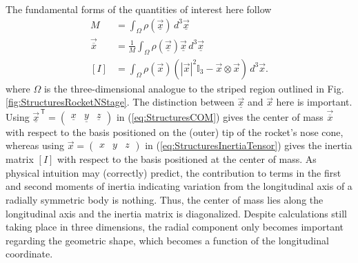 \documentclass[11pt,dvipsnames]{thesis}
\begin{document}
The fundamental forms of the quantities of interest here follow
\begin{align}
M &= \int_\Omega \rho(\vec{\underline{x}}) \,d^3\vec{\underline{x}} \label{eq:StructuresMass} \\
\vec{\overline{x}} &= \frac{1}{M}\int_\Omega \rho(\vec{\underline{x}}) \vec{\underline{x}} \,d^3\vec{\underline{x}} \label{eq:StructuresCOM} \\
[I] &= \int_\Omega \rho(\vec{x}) (|\vec{x}|^2 \mathbb{I}_{3} - \vec{x} \otimes \vec{x}) \,d^3\vec{x}. \label{eq:StructuresInertiaTensor}
\end{align}
where $\Omega$ is the three-dimensional analogue to the striped region outlined in Fig. \ref{fig:StructuresRocketNStage}. The distinction between $\vec{\underline{x}}$ and $\vec{x}$ here is important. Using $\vec{\underline{x}}^{\,\mathsf{T}} = \begin{pmatrix}\underline{x} & \underline{y} & \underline{z}\end{pmatrix}$ in (\ref{eq:StructuresCOM}) gives the center of mass $\vec{\overline{x}}$ with respect to the basis positioned on the (outer) tip of the rocket's nose cone, whereas using $\vec{x} = \begin{pmatrix}x & y & z\end{pmatrix}$ in (\ref{eq:StructuresInertiaTensor}) gives the inertia matrix $[I]$ with respect to the basis positioned at the center of mass.
As physical intuition may (correctly) predict, the contribution to terms in the first and second moments of inertia indicating variation from the longitudinal axis of a radially symmetric body is nothing. Thus, the center of mass lies along the longitudinal axis and the inertia matrix is diagonalized. Despite calculations still taking place in three dimensions, the radial component only becomes important regarding the geometric shape, which becomes a function of the longitudinal coordinate.
\end{document}
